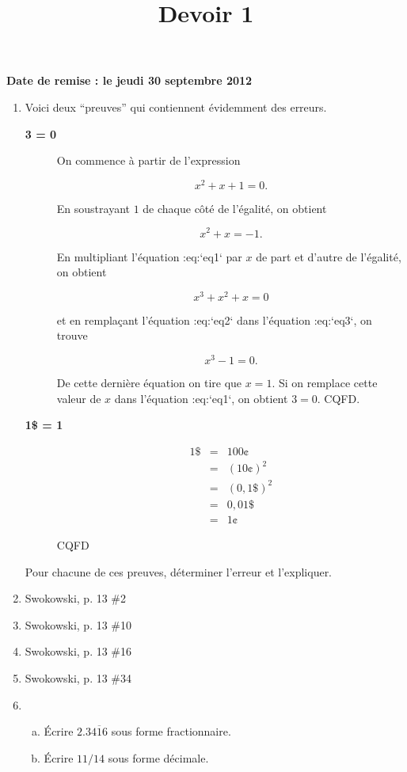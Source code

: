 \documentclass[]{article}
\title{Devoir 1}
\author{}
\date{}
\begin{document}
\maketitle

\textbf{Date de remise : le jeudi 30 septembre 2012}

\begin{enumerate}
\item
  Voici deux ``preuves'' qui contiennent évidemment des erreurs.

  \begin{description}
  \item[\textbf{3 = 0}]
  On commence à partir de l'expression

  \[x^2 + x + 1 = 0.\]

  En soustrayant $1$ de chaque côté de l'égalité, on obtient

  \[x^2 + x = -1.\]

  En multipliant l'équation :eq:`eq1` par $x$ de part et d'autre de
  l'égalité, on obtient

  \[x^3 + x^2 + x = 0\]

  et en remplaçant l'équation :eq:`eq2` dans l'équation :eq:`eq3`, on
  trouve

  \[x^3 - 1 = 0.\]

  De cette dernière équation on tire que $x = 1$. Si on remplace cette
  valeur de $x$ dans l'équation :eq:`eq1`, on obtient $3
  = 0$. CQFD.
  \item[\textbf{1\$ = 1\textcent}]
  \begin{eqnarray*}
  1 \$ &=& 100 \cent \\
  &=& (10 \cent)^2 \\
  &=& (0,1 \$)^2 \\
  &=& 0,01 \$ \\
  &=& 1 \cent
  \end{eqnarray*}

  CQFD
  \end{description}

  Pour chacune de ces preuves, déterminer l'erreur et l'expliquer.
\item
  Swokowski, p. 13 \#2
\item
  Swokowski, p. 13 \#10
\item
  Swokowski, p. 13 \#16
\item
  Swokowski, p. 13 \#34
\item
  \begin{enumerate}[a)]
  \item
    Écrire $2.3\overline{416}$ sous forme fractionnaire.
  \item
    Écrire $11/14$ sous forme décimale.
  \end{enumerate}
\end{enumerate}
\end{document}
